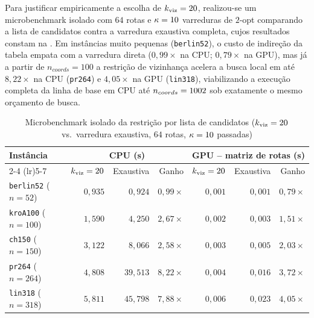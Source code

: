 Para justificar empiricamente a escolha de \(k_{\text{viz}} = 20\), realizou-se um microbenchmark isolado com \(64\) rotas e \(\kappa = 10\) varreduras de \(2\)-opt comparando a lista de candidatos contra a varredura exaustiva completa, cujos resultados constam na .
Em instâncias muito pequenas (\texttt{berlin52}), o custo de indireção da tabela empata com a varredura direta (\(0{,}99\times\) na CPU; \(0{,}79\times\) na GPU), mas já a partir de \(n_{coords} = 100\) a restrição de vizinhança acelera a busca local em até \(8{,}22\times\) na CPU (\texttt{pr264}) e \(4{,}05\times\) na GPU (\texttt{lin318}), viabilizando a execução completa da linha de base em CPU até \(n_{coords} = 1002\) sob exatamente o mesmo orçamento de busca.

\begin{table}[htbp]
      \centering
      \caption{Microbenchmark isolado da restrição por lista de candidatos (\(k_{\text{viz}} = 20\) vs.\ varredura exaustiva, \(64\) rotas, \(\kappa = 10\) passadas)}\label{tbl:candidate-k-microbenchmark}
      \begin{tabelapadrao}
            \begin{tabular}{@{}lrrrrrr@{}}
                  \toprule
                  Instância                    & \multicolumn{3}{c}{CPU (s)} & \multicolumn{3}{c}{GPU -- matriz de rotas (s)}                                                                                  \\
                  \cmidrule(lr){2-4} \cmidrule(lr){5-7}
                                               & \(k_{\text{viz}} = 20\)  & Exaustiva                                      & Ganho            & \(k_{\text{viz}} = 20\) & Exaustiva   & Ganho            \\
                  \midrule
                  \texttt{berlin52} (\(n=52\)) & \(0{,}935\)                 & \(0{,}924\)                                    & \(0{,}99\times\) & \(0{,}001\)                & \(0{,}001\) & \(0{,}79\times\) \\
                  \texttt{kroA100} (\(n=100\)) & \(1{,}590\)                 & \(4{,}250\)                                    & \(2{,}67\times\) & \(0{,}002\)                & \(0{,}003\) & \(1{,}51\times\) \\
                  \texttt{ch150} (\(n=150\))   & \(3{,}122\)                 & \(8{,}066\)                                    & \(2{,}58\times\) & \(0{,}003\)                & \(0{,}005\) & \(2{,}03\times\) \\
                  \texttt{pr264} (\(n=264\))   & \(4{,}808\)                 & \(39{,}513\)                                   & \(8{,}22\times\) & \(0{,}004\)                & \(0{,}016\) & \(3{,}72\times\) \\
                  \texttt{lin318} (\(n=318\))  & \(5{,}811\)                 & \(45{,}798\)                                   & \(7{,}88\times\) & \(0{,}006\)                & \(0{,}023\) & \(4{,}05\times\) \\
                  \bottomrule
            \end{tabular}
      \end{tabelapadrao}
\end{table}

